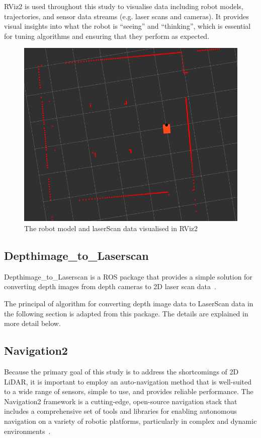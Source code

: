 RViz2 is used throughout this study to visualise data including robot models, 
trajectories, and sensor data streams (e.g. laser scans and cameras). 
It provides visual insights into what the robot is ``seeing'' and ``thinking'', 
which is essential for tuning algorithms and ensuring that they perform as expected.
\begin{figure}[H]
    \centering
    \includegraphics[width=0.8\linewidth]{figs/robotandlaser.png}
    \caption{The robot model and laserScan data visualised in RViz2}
\end{figure}
\subsection{Depthimage\_to\_Laserscan}
Depthimage\_to\_Laserscan is a ROS package that provides a simple solution for converting depth images from depth cameras to 2D laser scan data~\cite{rosdepthimage}. 

The principal of algorithm for converting depth image data to LaserScan data in the following section is adapted from this package. 
The details are explained in more detail below.

\subsection{Navigation2}
Because the primary goal of this study is to address the shortcomings of 2D LiDAR, 
it is important to employ an auto-navigation method that is well-suited to a wide range of sensors, 
simple to use, and provides reliable performance.
The Navigation2 framework is a cutting-edge, 
open-source navigation stack that includes a comprehensive set of tools and libraries 
for enabling autonomous navigation on a variety of robotic platforms, particularly in complex and dynamic environments~\cite{nav2}. 

